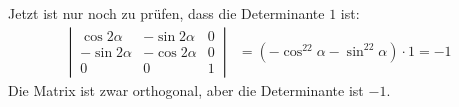 \begin{loesung}
\begin{teilaufgaben}
Jetzt ist nur noch zu prüfen, dass die Determinante $1$ ist:
\begin{align*}
\left|\,
\begin{matrix}
 \cos2\alpha &-\sin2\alpha & 0\\
-\sin2\alpha &-\cos2\alpha & 0\\
      0      &      0      & 1
\end{matrix}\,\right|
&=(-\cos^22\alpha-\sin^22\alpha)\cdot 1=-1
\end{align*}
Die Matrix ist zwar orthogonal, aber die Determinante ist $-1$.
\qedhere
\end{teilaufgaben}
\end{loesung}

